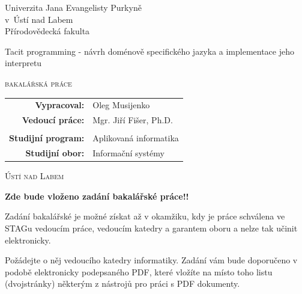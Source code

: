 \documentclass[male,czech]{kithesis}
\newcommand{\AUTOR}{Oleg Musijenko}
\newcommand{\TITULcz}{Tacit programming - návrh doménově specifického jazyka a implementace jeho interpretu} %
\newcommand{\VEDOUCI}{Mgr. Jiří Fišer, Ph.D.}
\newcommand{\PROGRAM}{Aplikovaná informatika}
\newcommand{\OBOR}{Informační systémy}
\begin{document}
\thispagestyle{empty}
\begin{center}
{\Huge Univerzita Jana Evangelisty Purkyně \\
v~Ústí nad Labem}
\\[16pt]
{\huge Přírodovědecká fakulta}

\vspace{2cm}

\vspace{2cm}
{
\huge
\TITULcz\par

\vspace{0.5em}
\LARGE\scshape bakalářská práce
}
\end{center} 
 
\vfill
{
\large
\begin{tabular}{>{\bfseries}rl}
    Vypracoval: 	& \AUTOR\\
    Vedoucí práce: 	& \VEDOUCI\\
&\\
Studijní program:       & \PROGRAM\\
Studijní obor:          & \OBOR\\
\end{tabular} 
}
\vspace{1.5cm}
\begin{center}
\Large\scshape   Ústí nad Labem \the\year
\end{center}

\cleardoublepage
\thispagestyle{empty}

\textbf{Zde bude vloženo zadání bakalářské práce!!}

Zadání bakalářské je možné získat až
v okamžiku, kdy je práce schválena ve STAGu vedoucím práce, vedoucím katedry a garantem oboru a nelze tak učinit elektronicky.

Požádejte o něj vedoucího katedry informatiky. Zadání vám bude doporučeno v podobě elektronicky podepsaného PDF, které vložíte na místo toho listu
(dvojstránky) některým z nástrojů pro práci s PDF dokumenty.
\end{document}
